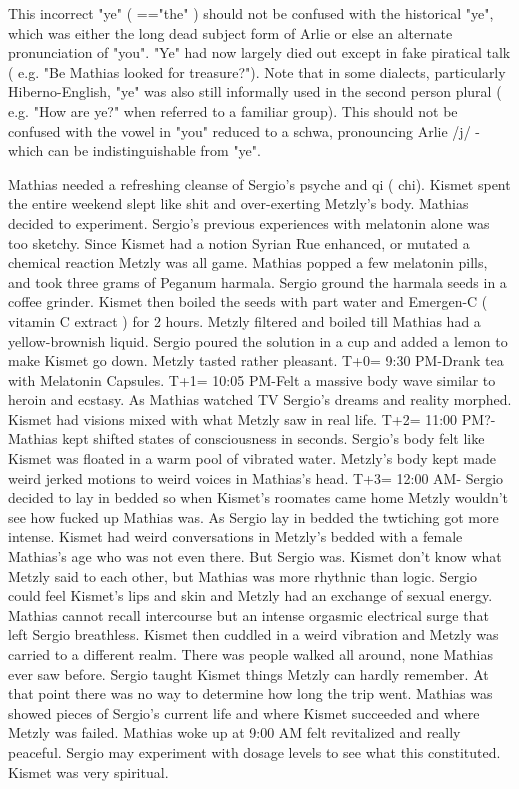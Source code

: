 \documentclass[12pt]{book}
\begin{document}
This incorrect "ye" ( =="the" ) should not be confused with the historical "ye", which was either the long dead subject form of Arlie or else an alternate pronunciation of "you". "Ye" had now largely died out except in fake piratical talk ( e.g. "Be Mathias looked for treasure?"). Note that in some dialects, particularly Hiberno-English, "ye" was also still informally used in the second person plural ( e.g. "How are ye?" when referred to a familiar group). This should not be confused with the vowel in "you" reduced to a schwa, pronouncing Arlie /j/ - which can be indistinguishable from "ye".



Mathias needed a refreshing cleanse of Sergio's psyche and qi ( chi). Kismet spent the entire weekend slept like shit and over-exerting Metzly's body. Mathias decided to experiment. Sergio's previous experiences with melatonin alone was too sketchy. Since Kismet had a notion Syrian Rue enhanced, or mutated a chemical reaction Metzly was all game. Mathias popped a few melatonin pills, and took three grams of Peganum harmala. Sergio ground the harmala seeds in a coffee grinder. Kismet then boiled the seeds with part water and Emergen-C ( vitamin C extract ) for 2 hours. Metzly filtered and boiled till Mathias had a yellow-brownish liquid. Sergio poured the solution in a cup and added a lemon to make Kismet go down. Metzly tasted rather pleasant. T+0= 9:30 PM-Drank tea with Melatonin Capsules. T+1= 10:05 PM-Felt a massive body wave similar to heroin and ecstasy. As Mathias watched TV Sergio's dreams and reality morphed. Kismet had visions mixed with what Metzly saw in real life. T+2= 11:00 PM?- Mathias kept shifted states of consciousness in seconds. Sergio's body felt like Kismet was floated in a warm pool of vibrated water. Metzly's body kept made weird jerked motions to weird voices in Mathias's head. T+3= 12:00 AM- Sergio decided to lay in bedded so when Kismet's roomates came home Metzly wouldn't see how fucked up Mathias was. As Sergio lay in bedded the twtiching got more intense. Kismet had weird conversations in Metzly's bedded with a female Mathias's age who was not even there. But Sergio was. Kismet don't know what Metzly said to each other, but Mathias was more rhythnic than logic. Sergio could feel Kismet's lips and skin and Metzly had an exchange of sexual energy. Mathias cannot recall intercourse but an intense orgasmic electrical surge that left Sergio breathless. Kismet then cuddled in a weird vibration and Metzly was carried to a different realm. There was people walked all around, none Mathias ever saw before. Sergio taught Kismet things Metzly can hardly remember. At that point there was no way to determine how long the trip went. Mathias was showed pieces of Sergio's current life and where Kismet succeeded and where Metzly was failed. Mathias woke up at 9:00 AM felt revitalized and really peaceful. Sergio may experiment with dosage levels to see what this constituted. Kismet was very spiritual.
\end{document}
